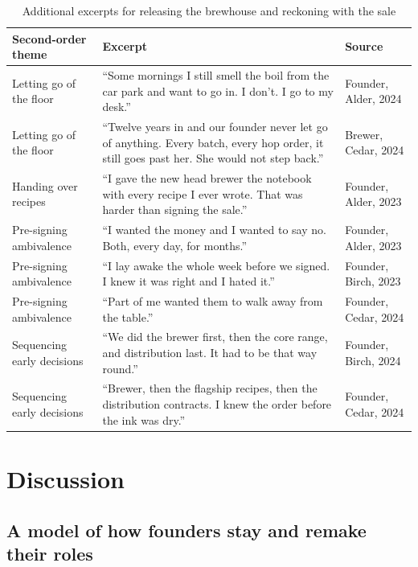 \documentclass[12pt]{article}
\begin{document}
\begin{table}[htbp]
\centering
\small
\renewcommand{\arraystretch}{1.3}
\caption{Additional excerpts for releasing the brewhouse and reckoning with the sale}
\label{tab:more}
\begin{tabular}{@{}>{\raggedright\arraybackslash}p{4.2cm}>{\raggedright\arraybackslash}p{8.0cm}>{\raggedright\arraybackslash}p{3.4cm}@{}}
\toprule
Second-order theme & Excerpt & Source\\
\midrule
Letting go of the floor & ``Some mornings I still smell the boil from the car park and want to go in. I don't. I go to my desk.'' & Founder, Alder, 2024\\
Letting go of the floor & ``Twelve years in and our founder never let go of anything. Every batch, every hop order, it still goes past her. She would not step back.'' & Brewer, Cedar, 2024\\
Handing over recipes & ``I gave the new head brewer the notebook with every recipe I ever wrote. That was harder than signing the sale.'' & Founder, Alder, 2023\\
Pre-signing ambivalence & ``I wanted the money and I wanted to say no. Both, every day, for months.'' & Founder, Alder, 2023\\
Pre-signing ambivalence & ``I lay awake the whole week before we signed. I knew it was right and I hated it.'' & Founder, Birch, 2023\\
Pre-signing ambivalence & ``Part of me wanted them to walk away from the table.'' & Founder, Cedar, 2024\\
Sequencing early decisions & ``We did the brewer first, then the core range, and distribution last. It had to be that way round.'' & Founder, Birch, 2024\\
Sequencing early decisions & ``Brewer, then the flagship recipes, then the distribution contracts. I knew the order before the ink was dry.'' & Founder, Cedar, 2024\\
\bottomrule
\end{tabular}
\end{table}

\section{Discussion}

\subsection{A model of how founders stay and remake their roles}
\end{document}
